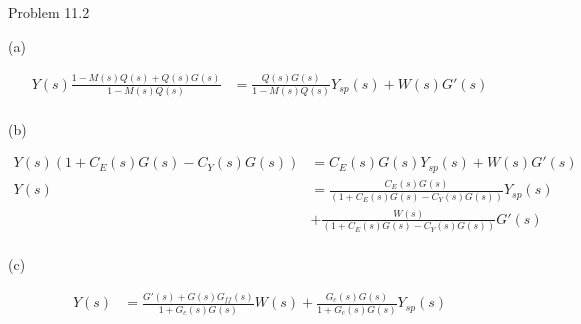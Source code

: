 \item Problem 11.2

(a)

\begin{align*}
    Y(s) \frac{1 - M(s)Q(s) + Q(s)G(s)}{1 - M(s)Q(s)} &= \frac{Q(s)G(s)}{1 - M(s)Q(s)} Y_{sp}(s) + W(s)G'(s) \\
\end{align*}

(b)

\begin{align*}
    Y(s) \left(1 + C_E(s)G(s) - C_Y(s)G(s)\right) &= C_E(s)G(s) Y_{sp}(s) + W(s) G'(s) \\
    Y(s) &= \frac{C_E(s)G(s)}{\left(1 + C_E(s)G(s) - C_Y(s)G(s)\right)} Y_{sp}(s) \\ 
    & + \frac{W(s)}{\left(1 + C_E(s)G(s) - C_Y(s)G(s)\right)} G'(s) \\
\end{align*}

(c)

\begin{align*}
    Y(s) &= \frac{G'(s) + G(s)G_{ff}(s)}{1 + G_c(s)G(s)} W(s) + \frac{G_c(s)G(s)}{1 + G_c(s)G(s)} Y_{sp}(s) \\
\end{align*}